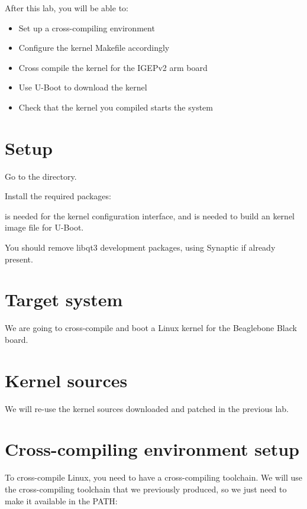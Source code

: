 
After this lab, you will be able to:
\begin{itemize}
\item Set up a cross-compiling environment
\item Configure the kernel Makefile accordingly
\item Cross compile the kernel for the IGEPv2 arm board
\item Use U-Boot to download the kernel
\item Check that the kernel you compiled starts the system
\end{itemize}

\section{Setup}

Go to the  directory.

Install the required packages:


 is needed for the  kernel configuration interface, and 
is needed to build an  kernel image file for U-Boot.

You should remove libqt3 development packages, using Synaptic if already present.

\section{Target system}

We are going to cross-compile and boot a Linux kernel for the Beaglebone Black
board.

\section{Kernel sources}

We will re-use the kernel sources downloaded and patched in the
previous lab.

\section{Cross-compiling environment setup}

To cross-compile Linux, you need to have a cross-compiling
toolchain. We will use the cross-compiling toolchain that we
previously produced, so we just need to make it available in the PATH:

